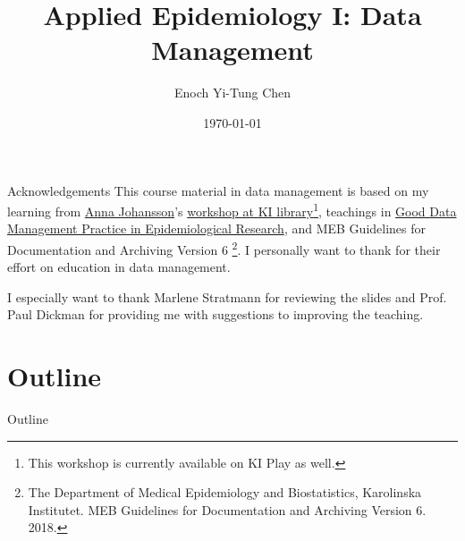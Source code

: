 


\title[Applied Epi I: Data Management]{Applied Epidemiology I: Data Management}
\date{\today}
\author[Enoch Yi-Tung Chen]{Enoch Yi-Tung Chen}




\begin{frame}
\maketitle 
\end{frame}

\begin{frame}{Acknowledgements}
This course material in data management is based on my learning from \href{https://staff.ki.se/people/annajo}{Anna Johansson}'s \href{https://play.ki.se/media/Data+Management+and+research+documentation+for+researchers/0_h64ki6v7?_ga=2.131118287.1557257458.1589785892-1364153581.1557067020}{workshop at KI library}\footnote{This workshop is currently available on KI Play as well. }, teachings in \href{https://kiwas.ki.se/katalog/katalog/kurs/851;jsessionid=e42ee2c1f6b081f28bf83e3d0321?lang=en}{Good Data Management Practice in Epidemiological Research}, and MEB Guidelines for Documentation and Archiving Version 6 \footnote{The Department of Medical Epidemiology and Biostatistics, Karolinska Institutet. MEB Guidelines for Documentation and Archiving Version 6. 2018.}. I personally want to thank for their effort on education in data management.

I especially want to thank Marlene Stratmann for reviewing the slides and Prof. Paul Dickman for providing me with suggestions to improving the teaching.

\end{frame}

\section*{Outline}
\begin{frame}{Outline}
          \tableofcontents
\end{frame}

